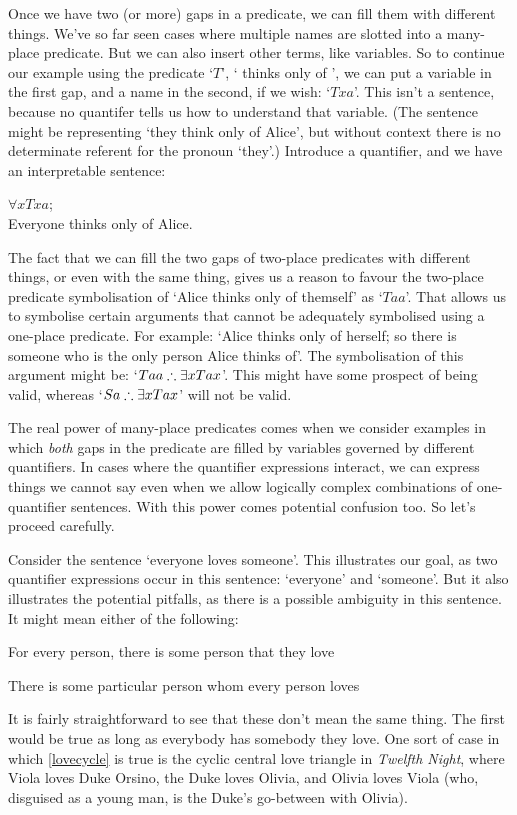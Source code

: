 Once we have two (or more) gaps in a predicate, we can fill them with different things. We've so far seen cases where multiple names are slotted into a many-place predicate. But we can also insert other terms, like variables. So to continue our example using the predicate `$T$', ` thinks only of ', we can put a variable in the first gap, and a name in the second, if we wish: `$Txa$'. This isn't a sentence, because no quantifer tells us how to understand that variable. (The sentence might be representing `they think only of Alice', but without context there is no determinate referent for the pronoun `they'.) Introduce a quantifier, and we have an interpretable sentence: 
\begin{earg}
	\item[\ex{selfi1}] $\forall x Txa$;\\ Everyone thinks only of Alice.
\end{earg}

The fact that we can fill the two gaps of two-place predicates with different things, or even with the same thing, gives us a reason to favour the two-place predicate symbolisation of `Alice thinks only of themself' as `$Taa$'. That allows us to symbolise certain arguments that cannot be adequately symbolised using a one-place predicate. For example: `Alice thinks only of herself; so there is someone who is the only person Alice thinks of'. The symbolisation of this argument might be: `$Taa \mathrel{\therefore} \exists x Tax$'. This might have some prospect of being valid, whereas `$Sa \mathrel{\therefore} \exists x Tax$' will not be valid.

The real power of many-place predicates comes when we consider examples in which \emph{both} gaps in the predicate are filled by variables governed by different quantifiers. In cases where the quantifier expressions interact, we can express things we cannot say even when we allow logically complex combinations of one-quantifier sentences. With this power comes potential confusion too. So let's proceed carefully. 

Consider the sentence `everyone loves someone'. This illustrates our goal, as two quantifier expressions occur in this sentence: `everyone' and `someone'. But it also illustrates the potential pitfalls, as there is a possible ambiguity in this sentence. It might mean either of the following:
	\begin{earg}
		\item[\ex{lovecycle}] For every person, there is some person that they love
		\item[\ex{loveconverge}] There is some particular person whom every person loves
	\end{earg} It is fairly straightforward to see that these don't mean the same thing. The first would be true as long as everybody has somebody they love. One sort of case in which \ref{lovecycle} is true is the cyclic central love triangle in \emph{Twelfth Night}, where Viola loves Duke Orsino, the Duke loves Olivia, and Olivia loves Viola (who, disguised as a young man, is the Duke's go-between with Olivia). 

